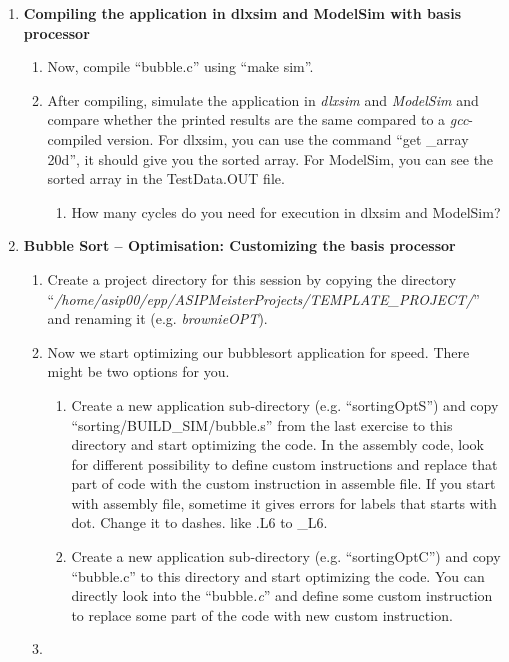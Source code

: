\begin{enumerate}
\item \textbf{Compiling the application in dlxsim and ModelSim with basis processor}
	\begin{enumerate}
		\item
		Now, compile ``bubble.c'' using ``make sim''.
		\item
		After compiling, simulate the application in \emph{dlxsim} and
		\emph{ModelSim} and compare whether the printed results are the same
		compared to a \emph{gcc}-compiled version. For dlxsim, you can use
		the command ``get \_array 20d'', it should give you the sorted
		array. For ModelSim, you can see the sorted array in the
		TestData.OUT file.
		\begin{enumerate}[label=(\alph*),start=3]
			\color{red}\item\normalcolor
			How many cycles do you need for execution in dlxsim and ModelSim?
		\end{enumerate}
	\end{enumerate}
\item \textbf{Bubble Sort -- Optimisation: Customizing the basis processor}
	\begin{enumerate}
		\item
		Create a project directory for this session by copying the directory
		``\emph{/home/asip00/­epp/ASIP­Meister­Projects/TEMPLATE\_PROJECT/}''
		and renaming it (e.g. \emph{brownieOPT}).
		\item
		Now we start optimizing our bubblesort application for speed. There
		might be two options for you.
		\begin{enumerate}
			\item
			Create a new application sub-directory (e.g. ``sortingOptS'') and
			copy ``sorting/BUILD\_SIM/bubble.s'' from the last exercise to
			this directory and start optimizing the code. In the assembly
			code, look for different possibility to define custom instructions
			and replace that part of code with the custom instruction in
			assemble file. If you start with assembly file, sometime it gives
			errors for labels that starts with dot. Change it to dashes. like
			.L6 to \_L6.
			\item
			Create a new application sub-directory (e.g. ``sortingOptC'') and
			copy ``bubble.c'' to this directory and start optimizing the code.
			You can directly look into the ``bubble\emph{.c}'' and define some
			custom instruction to replace some part of the code with new
			custom instruction.
		\end{enumerate}
		\item

\end{enumerate}
\end{enumerate}
